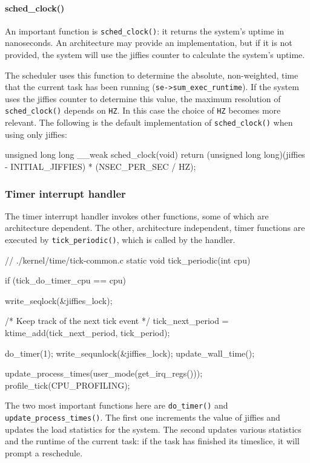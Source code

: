 \paragraph{sched\_clock()}
\label{sched_clock}
An important function is \verb|sched_clock()|: it returns the system's uptime in nanoseconds. An architecture may provide an implementation, but if it is not provided, the system will use the jiffies counter to calculate the system's uptime.

The scheduler uses this function to determine the absolute, non-weighted, time that the current task has been running (\verb|se->sum_exec_runtime|). If the system uses the jiffies counter to determine this value, the maximum resolution of \verb|sched_clock()| depends on \texttt{HZ}. In this case the choice of \texttt{HZ} becomes more relevant.
The following is the default implementation of \verb|sched_clock()| when using only jiffies:
\begin{code}
unsigned long long __weak sched_clock(void)
{
	return (unsigned long long)(jiffies - INITIAL_JIFFIES)
					* (NSEC_PER_SEC / HZ);
}
\end{code}

\subsubsection{Timer interrupt handler}

The timer interrupt handler invokes other functions, some of which are architecture dependent. The other, architecture independent, timer functions are executed by \verb|tick_periodic()|, which is called by the handler.

\begin{code}
// ./kernel/time/tick-common.c
static void tick_periodic(int cpu)
{
	if (tick_do_timer_cpu == cpu) {
		write_seqlock(&jiffies_lock);

		/* Keep track of the next tick event */
		tick_next_period = ktime_add(tick_next_period, tick_period);

		do_timer(1);
		write_sequnlock(&jiffies_lock);
		update_wall_time();
	}

	update_process_times(user_mode(get_irq_regs()));
	profile_tick(CPU_PROFILING);
}
\end{code}
The two most important functions here are \verb|do_timer()| and \verb|update_process_times()|. The first one increments the value of jiffies and updates the load statistics for the system. The second updates various statistics and the runtime of the current task: if the task has finished its timeslice, it will prompt a reschedule. %

